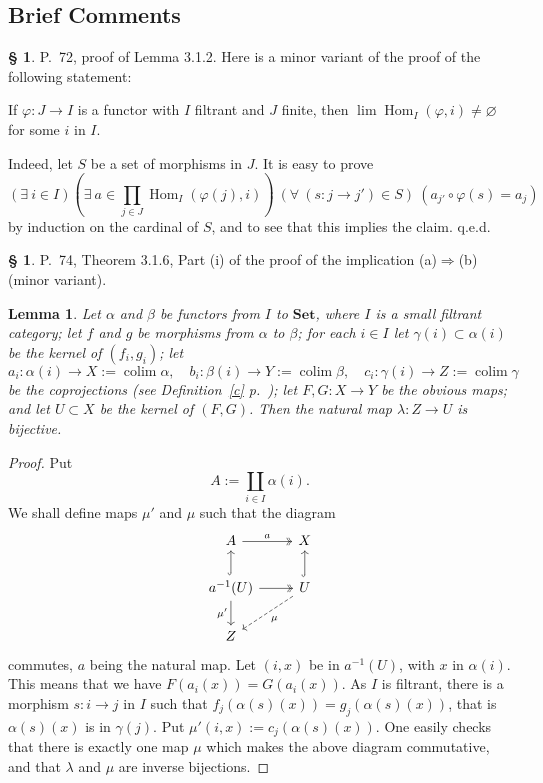 \documentclass[12pt]{article}
\newtheorem{lem}[thm]{Lemma}
\theoremstyle{remark}
\theoremstyle{definition}
\newtheorem{s}[thm]{\S}
\newcommand{\Set}{\mathbf{Set}}
\newcommand{\mv}{ (minor variant)}
\newcommand{\then}{\Rightarrow}
\DeclareMathOperator*{\coli}{colim}
\DeclareMathOperator{\Hom}{Hom}%
\begin{document}
\subsection{Brief Comments}
%
\begin{s} 
P.~72, proof of Lemma 3.1.2. Here is a minor variant of the proof of the following statement: 

If $\varphi:J\to I$ is a functor with $I$ filtrant and $J$ finite, then $\lim\Hom_I(\varphi,i)\neq\varnothing$ for some $i$ in $I$. 

Indeed, let $S$ be a set of morphisms in $J$. It is easy to prove 
$$
(\exists\ i\in I)\left(\exists\ a\in\prod_{j\in J}\Hom_I(\varphi(j),i)\right)\ (\forall\ (s:j\to j')\in S)\ (a_{j'}\circ\varphi(s)=a_j) 
$$ 
by induction on the cardinal of $S$, and to see that this implies the claim. q.e.d.
\end{s}
%
%
\begin{s} 
P.~74, Theorem 3.1.6, Part (i) of the proof of the implication (a)$\then$(b)\mv. 
%
\begin{lem} 
Let $\alpha$ and $\beta$ be functors from $I$ to $\Set$, where $I$ is a small filtrant category; let $f$ and $g$ be morphisms from $\alpha$ to $\beta$; for each $i\in I$ let $\gamma(i)\subset\alpha(i)$ be the kernel of $(f_i,g_i)$; let 
$$
a_i:\alpha(i)\to X:=\coli\alpha,\quad 
b_i:\beta(i)\to Y:=\coli\beta,\quad 
c_i:\gamma(i)\to Z:=\coli\gamma
$$ 
be the coprojections (see Definition~\ref{c} p.~\pageref{c}); let $F,G:X\to Y$ be the obvious maps; and let $U\subset X$ be the kernel of $(F,G)$. Then the natural map $\lambda:Z\to U$ is bijective.
\end{lem}
%
\begin{proof}
Put 
$$
A:=\coprod_{i\in I}\alpha(i).
$$
We shall define maps $\mu'$ and $\mu$ such that the diagram
$$
\begin{tikzcd}
A\ar[two heads]{r}{a}&X\\ 
a^{-1}(U)\ar[hook]{u}\ar{d}[swap]{\mu'}\ar[two heads]{r}&U\ar[hook]{u}\ar[dashed]{dl}{\mu}\\ 
Z
\end{tikzcd}
$$ 
commutes, $a$ being the natural map. Let $(i,x)$ be in $a^{-1}(U)$, with $x$ in $\alpha(i)$. This means that we have $F(a_i(x))=G(a_i(x))$. As $I$ is filtrant, there is a morphism $s:i\to j$ in $I$ such that $f_j(\alpha(s)(x))=g_j(\alpha(s)(x))$, that is $\alpha(s)(x)$ is in $\gamma(j)$. Put $\mu'(i,x):=c_j(\alpha(s)(x))$. One easily checks that there is exactly one map $\mu$ which makes the above diagram commutative, and that $\lambda$ and $\mu$ are inverse bijections.
\end{proof}
\end{s}
\end{document}
